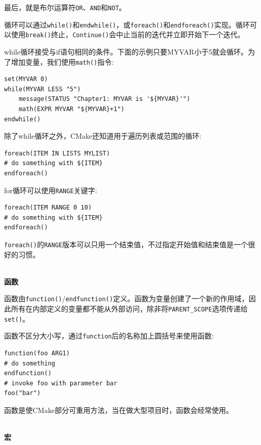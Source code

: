 最后，就是布尔运算符\texttt{OR}、\texttt{AND}和\texttt{NOT}。

循环可以通过\texttt{while()}和\texttt{endwhile()}，或\texttt{foreach()}和\texttt{endforeach()}实现。循环可以使用\texttt{break()}终止，\texttt{Continue()}会中止当前的迭代并立即开始下一个迭代。

while循环接受与if语句相同的条件。下面的示例只要MYVAR小于5就会循环。为了增加变量，我们使用\texttt{math()}指令:

\begin{lstlisting}[style=styleCMake]
set(MYVAR 0)
while(MYVAR LESS "5")
	message(STATUS "Chapter1: MYVAR is '${MYVAR}'")
	math(EXPR MYVAR "${MYVAR}+1")
endwhile()
\end{lstlisting}

除了while循环之外，CMake还知道用于遍历列表或范围的循环:

\begin{lstlisting}[style=styleCMake]
foreach(ITEM IN LISTS MYLIST)
# do something with ${ITEM}
endforeach()
\end{lstlisting}

for循环可以使用\texttt{RANGE}关键字:

\begin{lstlisting}[style=styleCMake]
foreach(ITEM RANGE 0 10)
# do something with ${ITEM}
endforeach()
\end{lstlisting}

\texttt{foreach()}的\texttt{RANGE}版本可以只用一个结束值，不过指定开始值和结束值是一个很好的习惯。

\hspace*{\fill} \\ %
\noindent
\textbf{函数}

函数由\texttt{function()}/\texttt{endfunction()}定义。函数为变量创建了一个新的作用域，因此所有在内部定义的变量都不能从外部访问，除非将\texttt{PARENT\_SCOPE}选项传递给\texttt{set()}。

函数不区分大小写，通过\texttt{function}后的名称加上圆括号来使用函数:

\begin{lstlisting}[style=styleCMake]
function(foo ARG1)
# do something
endfunction()
# invoke foo with parameter bar
foo("bar")
\end{lstlisting}

函数是使CMake部分可重用方法，当在做大型项目时，函数会经常使用。

\hspace*{\fill} \\ %
\noindent
\textbf{宏}


